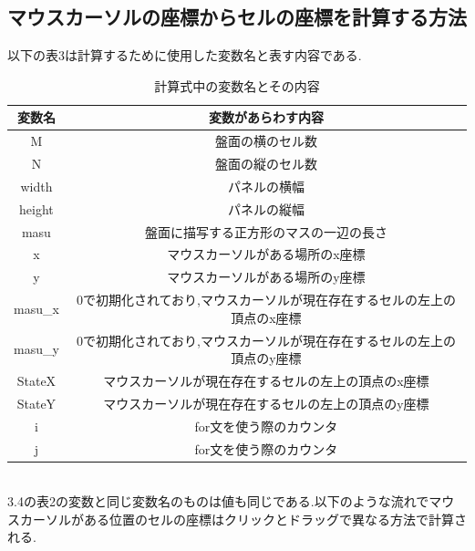 \documentclass[dvipdfmx]{jarticle}
\begin{document}
\subsection{マウスカーソルの座標からセルの座標を計算する方法}
以下の表3は計算するために使用した変数名と表す内容である.
\begin{table}[h]
    \centering
    \begin{tabular}{|c||c|}
        \hline
        変数名 & 変数があらわす内容\\
        \hline\hline
        M & 盤面の横のセル数\\\hline
        N & 盤面の縦のセル数\\\hline
        width & パネルの横幅\\\hline
        height & パネルの縦幅\\\hline
        masu & 盤面に描写する正方形のマスの一辺の長さ\\\hline
        x & マウスカーソルがある場所のx座標\\\hline
        y & マウスカーソルがある場所のy座標\\\hline
        masu\_x & 0で初期化されており,マウスカーソルが現在存在するセルの左上の頂点のx座標\\\hline
        masu\_y & 0で初期化されており,マウスカーソルが現在存在するセルの左上の頂点のy座標\\\hline
        StateX & マウスカーソルが現在存在するセルの左上の頂点のx座標\\\hline
        StateY & マウスカーソルが現在存在するセルの左上の頂点のy座標\\\hline
        i &for文を使う際のカウンタ\\\hline
        j &for文を使う際のカウンタ \\\hline
    \end{tabular}
    \caption{計算式中の変数名とその内容}
    \end{table}
\\3.4の表2の変数と同じ変数名のものは値も同じである.以下のような流れでマウスカーソルがある位置のセルの座標はクリックとドラッグで異なる方法で計算される.
\end{document}
